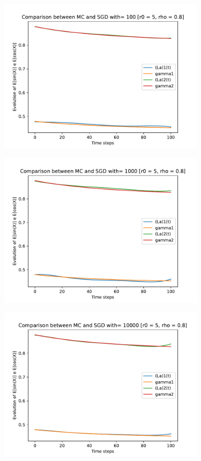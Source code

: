 \documentclass[a4paper,11pt,openright]{report}
\begin{document}
\begin{figure}[H]
\centering
\includegraphics[width=0.9\textwidth]{images/graphics T = 1/n = 5, M = 100 sine and cosine.pdf}
\end{figure}
\begin{figure}[H]
\centering
\includegraphics[width=0.9\textwidth]{images/graphics T = 1/n = 5, M = 1000 sine and cosine.pdf}
\end{figure}
\begin{figure}[H]
\centering
\includegraphics[width=0.9\textwidth]{images/graphics T = 1/n = 5, M = 10000 sine and cosine.pdf}
\end{figure}
\newpage
\end{document}
